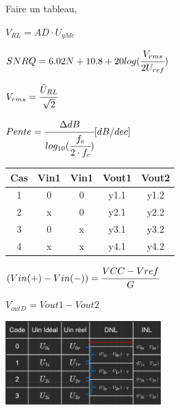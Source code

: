 

Faire un tableau,

$V_{RL} = AD \cdot U_{gMc}$

$SNRQ = 6.02N + 10.8 + 20log(\cfrac{V_{rms}}{2U_{ref}}) $

$V_{rms} = \cfrac{\hat{U}_{RL}}{\sqrt{2}} $

$Pente = \cfrac{\Delta dB}{log_{10}(\cfrac{f_e}{2\cdot f_c})}[dB/dec]$

\begin{tabular}{c|c|c|c|c}
    Cas & Vin1 & Vin1 & Vout1 & Vout2 \\\hline
    1 & 0 & 0 & y1.1 & y1.2 \\\hline
    2 & x & 0 & y2.1 & y2.2 \\\hline
    3 & 0 & x & y3.1 & y3.2 \\\hline
    4 & x & x & y4.1 & y4.2 \\
\end{tabular}

$(Vin(+)-Vin(-)) = \cfrac{VCC-Vref}{G}$

$V_{outD} = Vout1 - Vout2 $



\begin{center}
    \includegraphics[width = 0.45\textwidth]{img/Table.JPG}
\end{center}